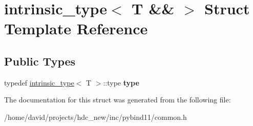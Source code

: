 \hypertarget{structintrinsic__type_3_01_t_01_6_6_01_4}{}\section{intrinsic\+\_\+type$<$ T \&\& $>$ Struct Template Reference}
\label{structintrinsic__type_3_01_t_01_6_6_01_4}
\subsection*{Public Types}
\begin{DoxyCompactItemize}
\item 
typedef \hyperlink{structintrinsic__type}{intrinsic\+\_\+type}$<$ T $>$\+::type {\bfseries type}\hypertarget{structintrinsic__type_3_01_t_01_6_6_01_4_a75c466ec3acf285f085eb64d8f063510}{}\label{structintrinsic__type_3_01_t_01_6_6_01_4_a75c466ec3acf285f085eb64d8f063510}

\end{DoxyCompactItemize}


The documentation for this struct was generated from the following file\+:\begin{DoxyCompactItemize}
\item 
/home/david/projects/hdc\+\_\+new/inc/pybind11/common.\+h\end{DoxyCompactItemize}
